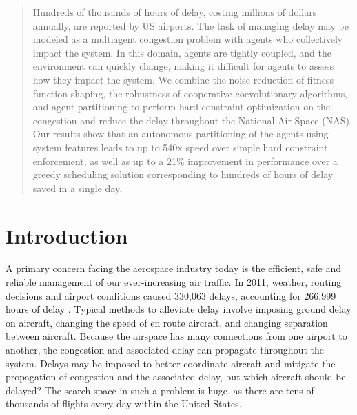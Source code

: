 \documentclass{sig-alternate}
\begin{document}
\maketitle
\begin{abstract}
Hundreds of thousands of hours of delay, costing millions of dollars annually, are reported by US airports. The task of managing delay may be modeled as a multiagent congestion problem with agents who collectively impact the system. In this domain, agents are tightly coupled, and the environment can quickly change, making it difficult for agents to assess how they impact the system. We combine the noise reduction of fitness function shaping, the robustness of cooperative coevolutionary algorithms, and agent partitioning to perform hard constraint optimization on the congestion and reduce the delay throughout the National Air Space (NAS). Our results show that an autonomous partitioning of the agents using system features leads to up to 540x speed over simple hard constraint enforcement, as well as up to a 21\% improvement in performance over a greedy scheduling solution corresponding to hundreds of hours of delay saved in a single day.
\end{abstract}



\vspace{-5pt}

\section{Introduction}
A primary concern facing the aerospace industry today is the efficient, safe and reliable management of our ever-increasing air traffic. In 2011, weather, routing decisions and airport conditions caused 330,063 delays, accounting for 266,999 hours of delay \cite{faa05}. Typical methods to alleviate delay involve imposing ground delay on aircraft, changing the speed of en route aircraft, and changing separation between aircraft. Because the airspace has many connections from one airport to another, the congestion and associated delay can propagate throughout the system. Delays may be imposed to better coordinate aircraft and mitigate the propagation of congestion and the associated delay, but which aircraft should be delayed? The search space in such a problem is huge, as there are tens of thousands of flights every day within the United States.
\end{document}
